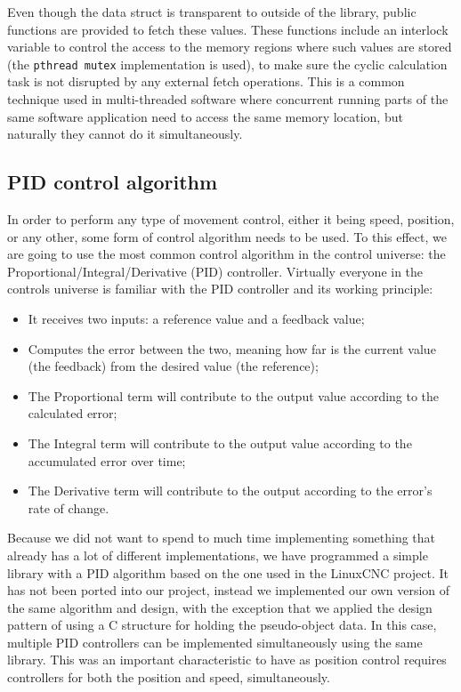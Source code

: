 Even though the data struct is transparent to outside of the library, public functions are provided to fetch these values.
These functions include an interlock variable to control the access to the memory regions where such values are stored (the \verb|pthread mutex| implementation is used), to make sure the cyclic calculation task is not disrupted by any external fetch operations.
This is a common technique used in multi-threaded software where concurrent running parts of the same software application need to access the same memory location, but naturally they cannot do it simultaneously.

\subsection{PID control algorithm}
In order to perform any type of movement control, either it being speed, position, or any other, some form of control algorithm needs to be used.
To this effect, we are going to use the most common control algorithm in the control universe: the Proportional/Integral/Derivative (PID) controller.
Virtually everyone in the controls universe is familiar with the PID controller and its working principle:

\begin{itemize}
	\item It receives two inputs: a reference value and a feedback value;
	\item Computes the error between the two, meaning how far is the current value (the feedback) from the desired value (the reference);
	\item The Proportional term will contribute to the output value according to the calculated error;
	\item The Integral term will contribute to the output value according to the accumulated error over time;
	\item The Derivative term will contribute to the output according to the error's rate of change.
\end{itemize}

Because we did not want to spend to much time implementing something that already has a lot of different implementations, we have programmed a simple library with a PID algorithm based on the one used in the LinuxCNC \cite{sw:linuxcnc} project.
It has not been ported into our project, instead we implemented our own version of the same algorithm and design, with the exception that we applied the design pattern of using a C structure for holding the pseudo-object data.
In this case, multiple PID controllers can be implemented simultaneously using the same library.
This was an important characteristic to have as position control requires controllers for both the position and speed, simultaneously.

